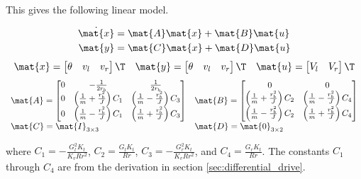This gives the following linear model.
\begin{theorem}
  \begin{align*}
    \dot{\mat{x}} &= \mat{A}\mat{x} + \mat{B}\mat{u} \\
    \mat{y} &= \mat{C}\mat{x} + \mat{D}\mat{u}
  \end{align*}
  \begin{equation*}
    \mat{x} =
    \begin{bmatrix}
      \theta & v_l & v_r
    \end{bmatrix}\T
    \quad
    \mat{y} =
    \begin{bmatrix}
      \theta & v_l & v_r
    \end{bmatrix}\T
    \quad
    \mat{u} =
    \begin{bmatrix}
      V_l & V_r
    \end{bmatrix}\T
  \end{equation*}
  \begin{equation}
    \begin{array}{ll}
      \mat{A} =
      \begin{bmatrix}
        0 & -\frac{1}{2r_b} & \frac{1}{2r_b} \\
        0 & \left(\frac{1}{m} + \frac{r_b^2}{J}\right) C_1 &
          \left(\frac{1}{m} - \frac{r_b^2}{J}\right) C_3 \\
        0 & \left(\frac{1}{m} - \frac{r_b^2}{J}\right) C_1 &
          \left(\frac{1}{m} + \frac{r_b^2}{J}\right) C_3
      \end{bmatrix} &
      \mat{B} =
      \begin{bmatrix}
        0 & 0 \\
        \left(\frac{1}{m} + \frac{r_b^2}{J}\right) C_2 &
        \left(\frac{1}{m} - \frac{r_b^2}{J}\right) C_4 \\
        \left(\frac{1}{m} - \frac{r_b^2}{J}\right) C_2 &
        \left(\frac{1}{m} + \frac{r_b^2}{J}\right) C_4
      \end{bmatrix} \\
      \mat{C} = \mat{I}_{3 \times 3} & \mat{D} = \mat{0}_{3 \times 2}
    \end{array}
  \end{equation}

  where $C_1 = -\frac{G_l^2 K_t}{K_v R r^2}$, $C_2 = \frac{G_l K_t}{Rr}$,
  $C_3 = -\frac{G_r^2 K_t}{K_v R r^2}$, and $C_4 = \frac{G_r K_t}{Rr}$. The
  constants $C_1$ through $C_4$ are from the derivation in section
  \ref{sec:differential_drive}.
\end{theorem}

